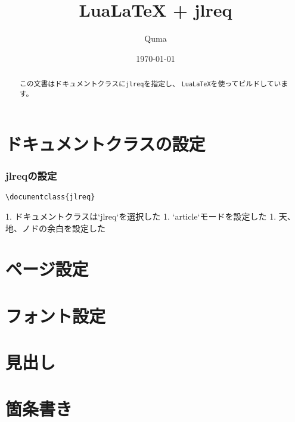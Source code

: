 \documentclass{jlreq}
\title{LuaLaTeX + jlreq}
\author{Quma}
\date{\today}
\begin{document}
\maketitle

\begin{abstract}
この文書はドキュメントクラスに\texttt{jlreq}を指定し、
\texttt{LuaLaTeX}を使ってビルドしています。
\end{abstract}

\tableofcontents
\part{ドキュメントクラスの設定}

\section{jlreqの設定}

\begin{verbatim}
\documentclass{jlreq}
\end{verbatim}

\begin{markdown}
1. ドキュメントクラスは`jlreq`を選択した
1. `article`モードを設定した
1. 天、地、ノドの余白を設定した
\end{markdown}



\part{ページ設定}




\part{フォント設定}




\part{見出し}


\part{箇条書き}




\end{document}
